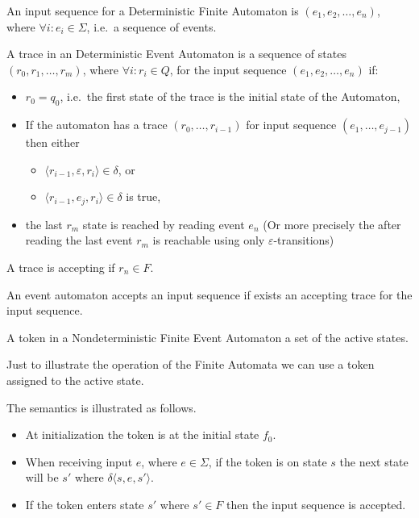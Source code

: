 			\begin{dfn}
				\label{dfn:cep:ea:inputseq}
				An input sequence for a Deterministic Finite Automaton is $(e_1, e_2, \dots, e_n )$, where $\forall i : e_i \in \Sigma$, i.e.~a sequence of events.
			\end{dfn}
		
			\begin{dfn}
				\label{dfn:cep:ea:trace}
				A trace in an Deterministic Event Automaton is
				a sequence of states $(r_0, r_1, \dots, r_m)$, where $\forall i: r_i \in Q$,
				for the input sequence $(e_1, e_2, \dots, e_n)$ if:
				\begin{itemize}
					\item $r_0 = q_0$, i.e.~the first state of the trace is the initial state of the Automaton,
					\item If the automaton has a trace $(r_0,\dots,r_{i-1})$ for input sequence $(e_1,\dots,e_{j-1})$ then either
					\begin{itemize} 
						\item $\langle r_{i-1}, \varepsilon, r_i \rangle \in \delta$, or
						\item  $\langle r_{i-1}, e_j, r_i \rangle \in \delta$ is true,
					\end{itemize}
					\item the last $r_m$ state is reached by reading event $e_n$ (Or more precisely the after reading the last event $r_m$ is reachable using only
					$\varepsilon$-transitions)
				\end{itemize}
				A trace is accepting if $r_n \in F$.
			\end{dfn}
		
			\begin{dfn}
				\label{dfn:cep:ea:accepting}
				An event automaton accepts an input sequence if exists an accepting trace for the input sequence.
			\end{dfn}
		
			\begin{dfn}
				\label{dfn:cep:ea:token}
				A token in a Nondeterministic Finite Event Automaton a set of the active states.
			\end{dfn}
			
			Just to illustrate the operation of the Finite Automata we can use a token assigned to the active state.
	
			The semantics is illustrated as follows. 
			\begin{itemize}
				\item At initialization the token is at the initial state $f_0$.
				\item When receiving input $e$, where $e \in \Sigma$, if the token is on state $s$ the next state will be $s'$ where
				$\delta \langle s,e,s' \rangle$.%
				\item If the token enters state $s'$ where $s' \in F$ then the input sequence is accepted. 			
			\end{itemize}
	
